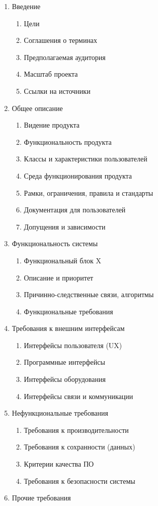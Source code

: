 \documentclass{../../text-style}
\begin{document}
\begin{enumerate}
    \item Введение
    \begin{enumerate}
        \item Цели
        \item Соглашения о терминах
        \item Предполагаемая аудитория
        \item Масштаб проекта
        \item Ссылки на источники
    \end{enumerate}
    \item Общее описание
    \begin{enumerate}
        \item Видение продукта
        \item Функциональность продукта
        \item Классы и характеристики пользователей
        \item Среда функционирования продукта
        \item Рамки, ограничения, правила и стандарты
        \item Документация для пользователей
        \item Допущения и зависимости
    \end{enumerate}
    \item Функциональность системы
    \begin{enumerate}
        \item Функциональный блок X
        \item Описание и приоритет
        \item Причинно-следственные связи, алгоритмы
        \item Функциональные требования
    \end{enumerate}
    \item Требования к внешним интерфейсам
    \begin{enumerate}
        \item Интерфейсы пользователя (UX)
        \item Программные интерфейсы
        \item Интерфейсы оборудования
        \item Интерфейсы связи и коммуникации
    \end{enumerate}
    \item Нефункциональные требования
    \begin{enumerate}
        \item Требования к производительности
        \item Требования к сохранности (данных)
        \item Критерии качества ПО
        \item Требования к безопасности системы
    \end{enumerate}
    \item Прочие требования
\end{enumerate}
\end{document}
